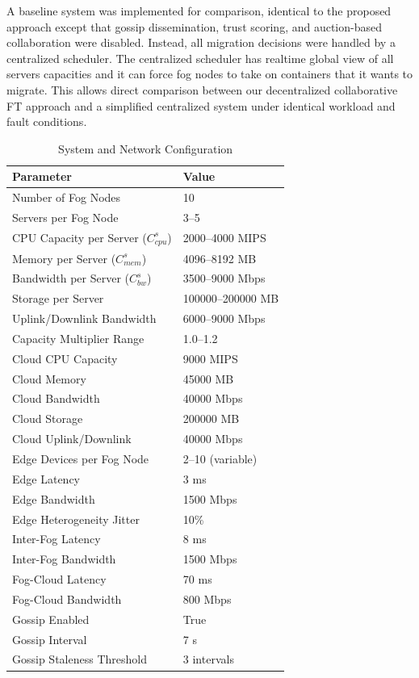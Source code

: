 \documentclass{article}
\begin{document}
A baseline system was implemented for comparison, identical to the proposed approach except that gossip dissemination, trust scoring, and auction-based collaboration were disabled. Instead, all migration decisions were handled by a centralized scheduler. The centralized scheduler has realtime global view of all servers capacities and it can force fog nodes to take on containers that it wants to migrate. This allows direct comparison between our decentralized collaborative FT approach and a simplified centralized system under identical workload and fault conditions.

\begin{table}[h!]
\centering
\caption{System and Network Configuration}
\label{tab:system_config}
\begin{tabular}{ll}
\toprule
\textbf{Parameter} & \textbf{Value} \\
\midrule
Number of Fog Nodes & 10 \\
Servers per Fog Node & 3--5 \\
CPU Capacity per Server ($C^{s}_{cpu}$) & 2000--4000 MIPS \\
Memory per Server ($C^{s}_{mem}$) & 4096--8192 MB \\
Bandwidth per Server ($C^{s}_{bw}$) & 3500--9000 Mbps \\
Storage per Server & 100000--200000 MB \\
Uplink/Downlink Bandwidth & 6000--9000 Mbps \\
Capacity Multiplier Range & 1.0--1.2 \\
\midrule
Cloud CPU Capacity & 9000 MIPS \\
Cloud Memory & 45000 MB \\
Cloud Bandwidth & 40000 Mbps \\
Cloud Storage & 200000 MB \\
Cloud Uplink/Downlink & 40000 Mbps \\
\midrule
Edge Devices per Fog Node & 2--10 (variable) \\
Edge Latency & 3 ms \\
Edge Bandwidth & 1500 Mbps \\
Edge Heterogeneity Jitter & 10\% \\
\midrule
Inter-Fog Latency & 8 ms \\
Inter-Fog Bandwidth & 1500 Mbps \\
Fog-Cloud Latency & 70 ms \\
Fog-Cloud Bandwidth & 800 Mbps \\
\midrule
Gossip Enabled & True \\
Gossip Interval & 7 s \\
Gossip Staleness Threshold & 3 intervals \\
\bottomrule
\end{tabular}
\end{table}
\end{document}

